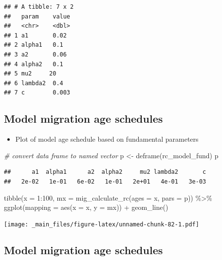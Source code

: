 \documentclass[
]{book}
\newenvironment{Shaded}{\begin{snugshade}}{\end{snugshade}}
\newcommand{\AttributeTok}[1]{\textcolor[rgb]{0.77,0.63,0.00}{#1}}
\newcommand{\CommentTok}[1]{\textcolor[rgb]{0.56,0.35,0.01}{\textit{#1}}}
\newcommand{\DecValTok}[1]{\textcolor[rgb]{0.00,0.00,0.81}{#1}}
\newcommand{\FunctionTok}[1]{\textcolor[rgb]{0.00,0.00,0.00}{#1}}
\newcommand{\NormalTok}[1]{#1}
\newcommand{\OtherTok}[1]{\textcolor[rgb]{0.56,0.35,0.01}{#1}}
\newcommand{\SpecialCharTok}[1]{\textcolor[rgb]{0.00,0.00,0.00}{#1}}
\providecommand{\tightlist}{%
  \setlength{\itemsep}{0pt}\setlength{\parskip}{0pt}}
\begin{document}
\begin{verbatim}
## # A tibble: 7 x 2
##   param    value
##   <chr>    <dbl>
## 1 a1       0.02 
## 2 alpha1   0.1  
## 3 a2       0.06 
## 4 alpha2   0.1  
## 5 mu2     20    
## 6 lambda2  0.4  
## 7 c        0.003
\end{verbatim}

\hypertarget{model-migration-age-schedules-1}{%
\subsection{Model migration age schedules}\label{model-migration-age-schedules-1}}

\begin{itemize}
\tightlist
\item
  Plot of model age schedule based on fundamental parameters
\end{itemize}

\begin{Shaded}
\begin{Highlighting}[]
\CommentTok{\# convert data frame to named vector}
\NormalTok{p }\OtherTok{\textless{}{-}} \FunctionTok{deframe}\NormalTok{(rc\_model\_fund)}
\NormalTok{p}
\end{Highlighting}
\end{Shaded}

\begin{verbatim}
##      a1  alpha1      a2  alpha2     mu2 lambda2       c 
##   2e-02   1e-01   6e-02   1e-01   2e+01   4e-01   3e-03
\end{verbatim}

\begin{Shaded}
\begin{Highlighting}[]
\FunctionTok{tibble}\NormalTok{(}\AttributeTok{x =} \DecValTok{1}\SpecialCharTok{:}\DecValTok{100}\NormalTok{, }
       \AttributeTok{mx =} \FunctionTok{mig\_calculate\_rc}\NormalTok{(}\AttributeTok{ages =}\NormalTok{ x, }\AttributeTok{pars =}\NormalTok{ p)) }\SpecialCharTok{\%\textgreater{}\%}
  \FunctionTok{ggplot}\NormalTok{(}\AttributeTok{mapping =} \FunctionTok{aes}\NormalTok{(}\AttributeTok{x =}\NormalTok{ x, }\AttributeTok{y =}\NormalTok{ mx)) }\SpecialCharTok{+}
  \FunctionTok{geom\_line}\NormalTok{()}
\end{Highlighting}
\end{Shaded}

\texttt{[image: \_main\_files/figure-latex/unnamed-chunk-82-1.pdf]}

\hypertarget{model-migration-age-schedules-2}{%
\subsection{Model migration age schedules}\label{model-migration-age-schedules-2}}
\end{document}
